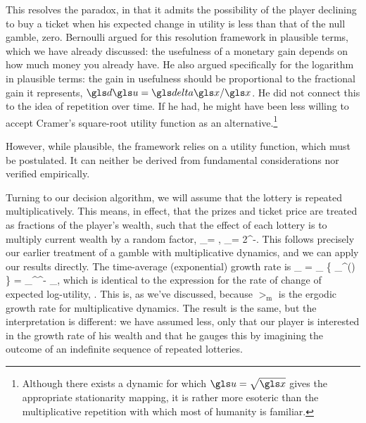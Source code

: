 This resolves the paradox, in that it admits the possibility of the player declining to buy a ticket when his expected change in utility is less than that of the null gamble, \ie zero. Bernoulli argued for this resolution framework in plausible terms, which we have already discussed: the usefulness of a monetary gain depends on how much money you already have. He also argued specifically for the logarithm in plausible terms: the gain in usefulness should be proportional to the fractional gain it represents, $\gd \gu = \d\x/\x$. He did not connect this to the idea of repetition over time. If he had, he might have been less willing to accept Cramer's square-root utility function as an alternative.\footnote{Although there exists a dynamic for which $\gu=\sqrt{\x}$ gives the appropriate stationarity mapping, it is rather more esoteric than the multiplicative repetition with which most of humanity is familiar.}

However, while plausible, the framework relies on a utility function, which must be postulated. It can neither be derived from fundamental considerations nor verified empirically.

Turning to our decision algorithm, we will assume that the lottery is repeated multiplicatively. This means, in effect, that the prizes and ticket price are treated as fractions of the player's wealth, such that the effect of each lottery is to multiply current wealth by a random factor,
\be
\gr_\gk = , \quad \p_\gk = 2^{-\gk}.
\ee
This follows precisely our earlier treatment of a gamble with multiplicative dynamics, and we can apply our results directly. 
The time-average (exponential) growth rate is
\be
\gt_ =  \lim_{\T\to\infty} \left\{   \sum_{}^\T \ln \gr(\gtau) \right\} =   \sum_{}^^{-\gk} \ln \gr_\gk, 
\ee
which is identical to the expression for the rate of change of expected log-utility, 
. This is, as we've discussed, because $\gt_\text{m}$ is 
the ergodic growth rate for multiplicative dynamics. The result is the same, but 
the interpretation is different: we have assumed less, only that our player is 
interested in the growth rate of his wealth and that he gauges this by imagining 
the outcome of an indefinite sequence of repeated lotteries.

